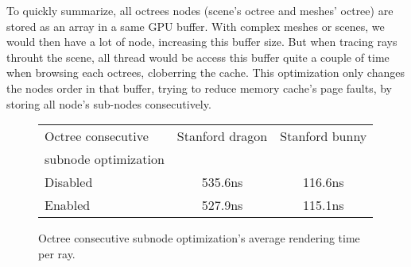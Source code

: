 To quickly summarize, all octrees nodes (scene's octree and meshes' octree) are
stored as an array in a same GPU buffer. With complex meshes or scenes, we would
then have a lot of node, increasing this buffer size. But when tracing rays
throuht the scene, all thread would be access this buffer quite a couple of time
when browsing each octrees, cloberring the cache. This optimization only changes
the nodes order in that buffer, trying to reduce memory cache's page faults, by
storing all node's sub-nodes consecutively.

\begin{figure}[H]
    \tiny
    \centering
    \begin{tabular}{ | l | c | c | }

        \hline
        Octree consecutive & Stanford dragon & Stanford bunny \\
        subnode optimization & ~ & ~ \\
        \hline
        Disabled & 535.6ns & 116.6ns \\
        Enabled & 527.9ns & 115.1ns \\
        \hline

    \end{tabular}
    \caption{
        Octree consecutive subnode optimization's average rendering time
        per ray.
    }
    \label{table:octree_consecutive_subnode}
\end{figure}
